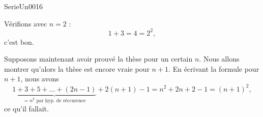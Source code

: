 

\begin{corrige}{SerieUn0016}

	Vérifions avec $n=2$ :
	\begin{equation}
		1+3=4=2^2,
	\end{equation}
	c'est bon.

	Supposons maintenant avoir prouvé la thèse pour un certain $n$. Nous allons montrer qu'alors la thèse est encore vraie pour $n+1$. En écrivant la formule pour $n+1$, nous avons
	\begin{equation}
		\underbrace{1+3+5+\ldots+(2n-1)}_{\text{$=n^2$ par hyp. de réccurence}}+2(n+1)-1=n^2+2n+2-1=(n+1)^2,
	\end{equation}
	ce qu'il fallait.

\end{corrige}
